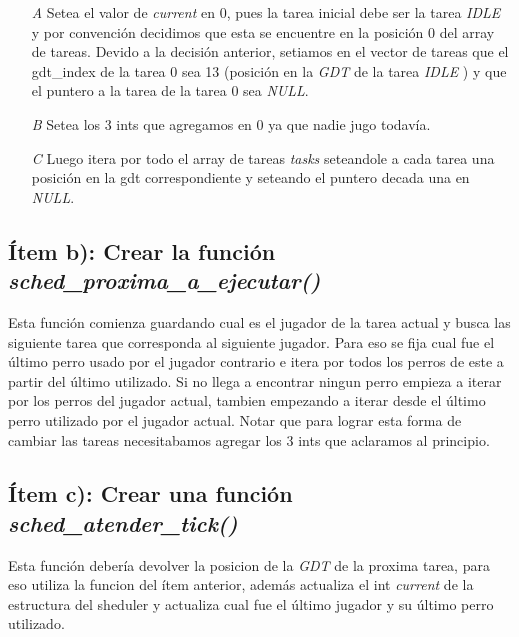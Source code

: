 \begin{itemize}

\item [\textit{A}] Setea el valor de \textit{current} en 0, pues la tarea inicial debe ser la tarea \textit{IDLE} y por convención decidimos que esta se encuentre en la posición 0 del array de tareas. Devido a la decisión anterior, setiamos en el vector de tareas que el gdt\_index de la tarea 0 sea 13 (posición en la \textit{GDT} de la tarea \textit{IDLE} ) y que el puntero a la tarea de la tarea 0 sea \textit{NULL}.

\item [\textit{B}] Setea los 3 ints que agregamos en 0 ya que nadie jugo todavía.

\item [\textit{C}] Luego itera por todo el array de tareas \textit{tasks} seteandole a cada tarea una posición en la gdt correspondiente y seteando el puntero decada una en \textit{NULL}.

\end{itemize}

\subsection{Ítem b):  Crear la función  \textit{sched\_proxima\_a\_ejecutar()}}

Esta función comienza guardando cual es el jugador de la tarea actual y busca las siguiente tarea que corresponda al siguiente jugador. Para eso se fija cual fue el último perro usado por el jugador contrario e itera por todos los perros de este a partir del último utilizado. Si no llega a encontrar ningun perro empieza a iterar por los perros del jugador actual, tambien empezando a iterar desde el último perro utilizado por el jugador actual. Notar que para lograr esta forma de cambiar las tareas necesitabamos agregar los 3 ints que aclaramos al principio.


\subsection{Ítem c):  Crear una función \textit{sched\_atender\_tick()}}

Esta función debería devolver la posicion de la \textit{GDT} de la proxima tarea, para eso utiliza la funcion del ítem anterior, además actualiza el int \textit{current} de la estructura del sheduler y actualiza cual fue el último jugador y su último perro utilizado.

